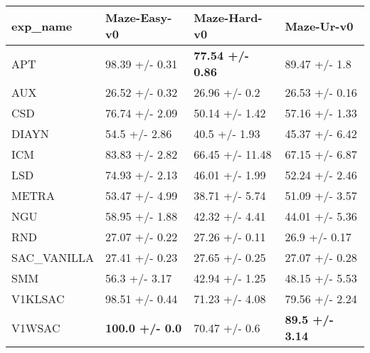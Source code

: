 \begin{tabular}{llll}
\hline
 exp\_name    & Maze-Easy-v0           & Maze-Hard-v0            & Maze-Ur-v0             \\
\hline
 APT         & 98.39 +/- 0.31         & \textbf{77.54 +/- 0.86} & 89.47 +/- 1.8          \\
 AUX         & 26.52 +/- 0.32         & 26.96 +/- 0.2           & 26.53 +/- 0.16         \\
 CSD         & 76.74 +/- 2.09         & 50.14 +/- 1.42          & 57.16 +/- 1.33         \\
 DIAYN       & 54.5 +/- 2.86          & 40.5 +/- 1.93           & 45.37 +/- 6.42         \\
 ICM         & 83.83 +/- 2.82         & 66.45 +/- 11.48         & 67.15 +/- 6.87         \\
 LSD         & 74.93 +/- 2.13         & 46.01 +/- 1.99          & 52.24 +/- 2.46         \\
 METRA       & 53.47 +/- 4.99         & 38.71 +/- 5.74          & 51.09 +/- 3.57         \\
 NGU         & 58.95 +/- 1.88         & 42.32 +/- 4.41          & 44.01 +/- 5.36         \\
 RND         & 27.07 +/- 0.22         & 27.26 +/- 0.11          & 26.9 +/- 0.17          \\
 SAC\_VANILLA & 27.41 +/- 0.23         & 27.65 +/- 0.25          & 27.07 +/- 0.28         \\
 SMM         & 56.3 +/- 3.17          & 42.94 +/- 1.25          & 48.15 +/- 5.53         \\
 V1KLSAC     & 98.51 +/- 0.44         & 71.23 +/- 4.08          & 79.56 +/- 2.24         \\
 V1WSAC      & \textbf{100.0 +/- 0.0} & 70.47 +/- 0.6           & \textbf{89.5 +/- 3.14} \\
\hline
\end{tabular}